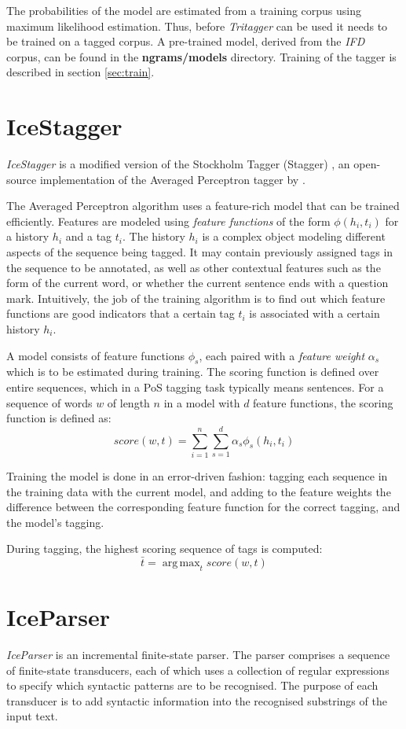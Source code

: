 \documentclass[11pt]{article}
\begin{document}
The probabilities of the model are estimated from a training corpus using maximum likelihood estimation.
Thus, before \emph{Tritagger} can be used it needs to be trained on a tagged corpus.
A pre-trained model, derived from the \emph{IFD} corpus, can be found in the {\bf ngrams/models} directory.
Training of the tagger is described in section \ref{sec:train}.

\section{IceStagger}
\emph{IceStagger} \citep{lof13} is a modified version of the Stockholm Tagger (Stagger) \citep{ost13}, an open-source implementation of the Averaged Perceptron tagger by  \cite{col02}. 

The Averaged Perceptron algorithm uses a feature-rich model that can be trained efficiently.
Features are modeled using \emph{feature functions} of the form
$\phi(h_i,t_i)$ for a history $h_i$ and a tag $t_i$.
The history $h_i$ is a complex object modeling different aspects of the sequence
being tagged. It may contain previously assigned tags in the sequence to be
annotated, as well as other contextual features such as the form of the
current word, or whether the current sentence ends with a question mark.
Intuitively, the job of the training algorithm is to find out which feature
functions are good indicators that a certain tag $t_i$ is associated with a
certain history $h_i$.

A model consists of feature functions $\phi_s$, each paired with a
\emph{feature weight} $\alpha_s$ which is to be estimated during training.
The scoring function is defined over entire sequences, which in a PoS
tagging task typically means sentences. For a sequence of words $w$ of length
$n$ in a model with $d$ feature functions, the scoring function is defined as:
$$ \mathit{score}(w,t) = \sum_{i=1}^n \sum_{s=1}^d \alpha_s\phi_s(h_i,t_i) $$

Training the model is done in an error-driven fashion: tagging each sequence
in the training data with the current model, and adding to the feature weights
the difference between the corresponding feature function for the correct
tagging, and the model's tagging.

During tagging, the highest scoring sequence of tags is computed:
$$ \bar{t} = \operatorname{arg\,max}_t \mathit{score}(w,t) $$

\section{IceParser}
\emph{IceParser} is an incremental finite-state parser.
The parser comprises a sequence of finite-state transducers, each of which uses a collection of regular expressions to specify which syntactic patterns are to be recognised.
The purpose of each transducer is to add syntactic information into the recognised substrings of the input text.
\end{document}

